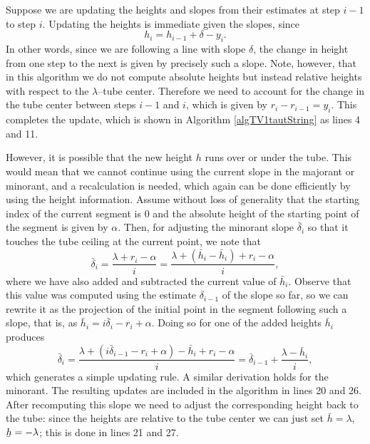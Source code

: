 \documentclass[twoside,11pt]{article}
\newcommand{\ubar}[1]{\underaccent{\bar}{#1}}
\numberwithin{equation}{section}
\numberwithin{theorem}{section}
\begin{document}
Suppose we are updating the heights and slopes from their estimates at step $i-1$ to step $i$. Updating the heights is immediate given the slopes, since
\begin{equation*}
 h_{i} = h_{i-1} + \delta - y_i.
\end{equation*}
In other words, since we are following a line with slope $\delta$, the change in height from one step to the next is given by precisely such a slope. Note, however, that in this algorithm we do not compute absolute heights but instead relative heights with respect to the $\lambda$--tube center. Therefore we need to account for the change in the tube center between steps $i-1$ and $i$, which is given by $r_{i} - r_{i-1} = y_{i}$. This completes the update, which is shown in Algorithm \ref{algTV1tautString} as lines 4 and 11.

However, it is possible that the new height $h$ runs over or under the tube. This would mean that we cannot continue using the current slope in the majorant or minorant, and a recalculation is needed, which again can be done efficiently by using the height information. Assume without loss of generality that the starting index of the current segment is $0$ and the absolute height of the starting point of the segment is given by $\alpha$. Then, for adjusting the minorant slope $\bar \delta_i$ so that it touches the tube ceiling at the current point, we note that
\begin{equation*}
 \bar \delta_i = \frac{\lambda + r_i - \alpha}{i} = \frac{\lambda + (\bar h_i - \bar h_i) + r_i - \alpha}{i},
\end{equation*}
where we have also added and subtracted the current value of $\bar h_i$. Observe that this value was computed using the estimate $\delta_{i-1}$ of the slope so far, so we can rewrite it as the projection of the initial point in the segment following such a slope, that is, as $\bar h_{i} = i \bar \delta_{i} - r_{i} + \alpha$. Doing so for one of the added heights $\bar h_{i}$ produces
\begin{equation*}
 \bar \delta_i = \frac{\lambda + (i \bar \delta_{i-1} - r_{i} + \alpha) - \bar h_i + r_{i} - \alpha}{i} = \bar \delta_{i-1} + \frac{\lambda - \bar h_i}{i},
\end{equation*}
which generates a simple updating rule. A similar derivation holds for the minorant. The resulting updates are included in the algorithm in lines 20 and 26. After recomputing this slope we need to adjust the corresponding height back to the tube: since the heights are relative to the tube center we can just set $\bar h = \lambda$,  $\ubar h = -\lambda$; this is done in lines 21 and 27.
\end{document}
